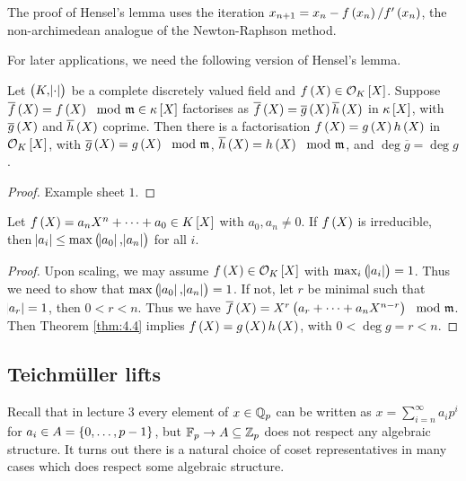 \begin{remark*}
The proof of Hensel's lemma uses the iteration $ x_{n + 1} = x_n - f\br{x_n} / f'\br{x_n} $, the non-archimedean analogue of the Newton-Raphson method.
\end{remark*}

For later applications, we need the following version of Hensel's lemma.

\begin{theorem}
\label{thm:4.4}
Let $ \br{K, \abs{\cdot}} $ be a complete discretely valued field and $ f\br{X} \in \OOO_K\sbr{X} $. Suppose $ \overline{f}\br{X} = f\br{X} \mod \mmm \in \kappa\sbr{X} $ factorises as $ \overline{f}\br{X} = \overline{g}\br{X}\overline{h}\br{X} $ in $ \kappa\sbr{X} $, with $ \overline{g}\br{X} $ and $ \overline{h}\br{X} $ coprime. Then there is a factorisation $ f\br{X} = g\br{X}h\br{X} $ in $ \OOO_K\sbr{X} $, with $ \overline{g}\br{X} = g\br{X} \mod \mmm $, $ \overline{h}\br{X} = h\br{X} \mod \mmm $, and $ \deg \overline{g} = \deg g $.
\end{theorem}

\begin{proof}
Example sheet $ 1 $.
\end{proof}

\begin{corollary}
\label{cor:4.5}
Let $ f\br{X} = a_nX^n + \dots + a_0 \in K\sbr{X} $ with $ a_0, a_n \ne 0 $. If $ f\br{X} $ is irreducible, then $ \abs{a_i} \le \max\br{\abs{a_0}, \abs{a_n}} $ for all $ i $.
\end{corollary}

\begin{proof}
Upon scaling, we may assume $ f\br{X} \in \OOO_K\sbr{X} $ with $ \max_i \br{\abs{a_i}} = 1 $. Thus we need to show that $ \max\br{\abs{a_0}, \abs{a_n}} = 1 $. If not, let $ r $ be minimal such that $ \abs{a_r} = 1 $, then $ 0 < r < n $. Thus we have $ \overline{f}\br{X} = X^r\br{a_r + \dots + a_nX^{n - r}} \mod \mmm $. Then Theorem \ref{thm:4.4} implies $ f\br{X} = g\br{X}h\br{X} $, with $ 0 < \deg g = r < n $.
\end{proof}

\subsection{Teichm\"uller lifts}


Recall that in lecture $ 3 $ every element of $ x \in \mathbb{Q}_p $ can be written as $ x = \sum_{i = n}^\infty a_ip^i $ for $ a_i \in A = \cbr{0, \dots, p - 1} $, but $ \mathbb{F}_p \to A \subseteq \mathbb{Z}_p $ does not respect any algebraic structure. It turns out there is a natural choice of coset representatives in many cases which does respect some algebraic structure.

